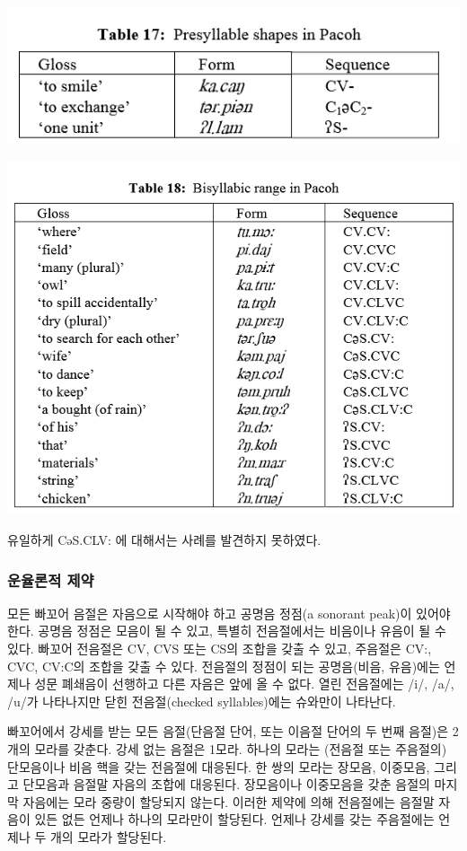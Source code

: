 \begin{center}
\includegraphics{Pacoh/src/PacohTable17.png}

\includegraphics{Pacoh/src/PacohTable18.png}
\end{center}

유일하게 CəS.CLV: 에 대해서는 사례를 발견하지 못하였다.

\subsubsection{운율론적 제약}
모든 빠꼬어 음절은 자음으로 시작해야 하고 공명음 정점(a sonorant peak)이 있어야 한다. 공명음 정점은 모음이 될 수 있고, 특별히 전음절에서는 비음이나 유음이 될 수 있다. 빠꼬어 전음절은 CV, CVS 또는 CS의 조합을 갖출 수 있고, 주음절은 CV:, CVC, CV:C의 조합을 갖출 수 있다. 전음절의 정점이 되는 공명음(비음, 유음)에는 언제나 성문 폐쇄음이 선행하고 다른 자음은 앞에 올 수 없다. 열린 전음절에는 /i/, /a/, /u/가 나타나지만 닫힌 전음절(checked syllables)에는 슈와만이 나타난다.

빠꼬어에서 강세를 받는 모든 음절(단음절 단어, 또는 이음절 단어의 두 번째 음절)은 2개의 모라를 갖춘다. 강세 없는 음절은 1모라. 하나의 모라는 (전음절 또는 주음절의) 단모음이나 비음 핵을 갖는 전음절에 대응된다. 한 쌍의 모라는 장모음, 이중모음, 그리고 단모음과 음절말 자음의 조합에 대응된다. 장모음이나 이중모음을 갖춘 음절의 마지막 자음에는 모라 중량이 할당되지 않는다. 이러한 제약에 의해 전음절에는 음절말 자음이 있든 없든 언제나 하나의 모라만이 할당된다. 언제나 강세를 갖는 주음절에는 언제나 두 개의 모라가 할당된다.

